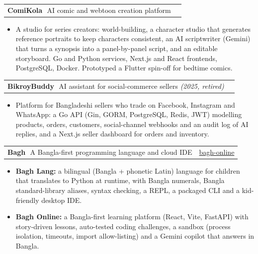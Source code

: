 \documentclass[10pt,a4paper]{article}
\makeatletter
\newcommand{\lnk}[2]{\href{#1}{\color{accent}#2}}
\newcommand{\proj}[3]{%
  \vspace{5pt}%
  \begin{tabularx}{\linewidth}{@{}X r@{}}
    {\sffamily\bfseries #1}\,{\small\color{muted}\textbar\ #2} & \small #3
  \end{tabularx}\par\vspace{-1pt}}
\makeatother
\begin{document}
\proj{ComiKola}{AI comic and webtoon creation platform}{}
\begin{itemize}
  \item A studio for series creators: world-building, a character studio that generates reference portraits to keep characters
        consistent, an AI scriptwriter (Gemini) that turns a synopsis into a panel-by-panel script, and an editable storyboard.
        Go and Python services, Next.js and React frontends, PostgreSQL, Docker. Prototyped a Flutter spin-off for bedtime comics.
\end{itemize}

\proj{BikroyBuddy}{AI assistant for social-commerce sellers \textit{(2025, retired)}}{}
\begin{itemize}
  \item Platform for Bangladeshi sellers who trade on Facebook, Instagram and WhatsApp: a Go API (Gin, GORM, PostgreSQL, Redis,
        JWT) modelling products, orders, customers, social-channel webhooks and an audit log of AI replies, and a Next.js seller
        dashboard for orders and inventory.
\end{itemize}

\proj{Bagh}{A Bangla-first programming language and cloud IDE}%
  {\lnk{https://github.com/shihabshahrier/bagh-online}{bagh-online}}
\begin{itemize}
  \item \textbf{Bagh Lang:} a bilingual (Bangla + phonetic Latin) language for children that translates to Python at runtime,
        with Bangla numerals, Bangla standard-library aliases, syntax checking, a REPL, a packaged CLI and a kid-friendly desktop IDE.
  \item \textbf{Bagh Online:} a Bangla-first learning platform (React, Vite, FastAPI) with story-driven lessons, auto-tested
        coding challenges, a sandbox (process isolation, timeouts, import allow-listing) and a Gemini copilot that answers in Bangla.
\end{itemize}

\end{document}
